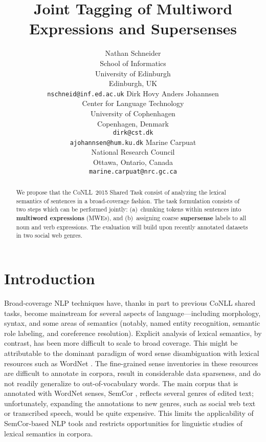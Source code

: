\documentclass[11pt]{article}
\title{Joint Tagging of Multiword Expressions and Supersenses}
\author{
Nathan Schneider \\
		School of Informatics\\
	   	University of Edinburgh\\
	    Edinburgh, UK\\
	    {\tt nschneid@inf.ed.ac.uk} \And
Dirk Hovy \quad Anders Johannsen\\
Center for Language Technology\\
University of Cophenhagen\\
Copenhagen, Denmark\\
{\tt dirk@cst.dk}\\ {\tt ajohannsen@hum.ku.dk} \And
Marine Carpuat\\
National Research Council\\
Ottawa, Ontario, Canada\\
{\tt marine.carpuat@nrc.gc.ca}}
\date{}
\newcommand{\ensuretext}[1]{#1}
\newcommand{\nssmarker}{\ensuretext{\textcolor{magenta}{\ensuremath{^{\textsc{NS}}_{\textsc{S}}}}}}
\newcommand{\arkcomment}[3]{\ensuretext{\textcolor{#3}{[#1 #2]}}}
\newcommand{\nss}[1]{\arkcomment{\nssmarker}{#1}{magenta}}
\newcommand{\longversion}[1]{} %
\begin{document}
\maketitle

\begin{abstract}
We propose that the CoNLL~2015 Shared Task 
consist of analyzing the lexical semantics of sentences 
in a broad-coverage fashion. 
The task formulation consists of two steps which can be performed jointly:
(a)~chunking tokens within sentences into \textbf{multiword expressions} (MWEs), and 
(b)~assigning coarse \textbf{supersense} labels to all noun and verb expressions. 
The evaluation will build upon recently annotated datasets in two social web genres.
\longversion{We expect that the task formulation will foster engagement across 
multiple subcommunities of computational semantics, 
and facilitate empirical comparison of methodologically diverse systems.}
\end{abstract}

\section{Introduction}

Broad-coverage NLP techniques have, thanks in part to previous CoNLL shared tasks, 
become mainstream for several aspects of language---including morphology, syntax, 
and some areas of semantics (notably, named entity recognition, %
semantic role labeling, %
and coreference resolution). %
Explicit analysis of lexical semantics, by contrast, has been more difficult to scale 
to broad coverage. %
This might be attributable to the dominant paradigm of word sense disambiguation 
with lexical resources such as WordNet \citep{wordnet}.
The fine-grained sense inventories in these resources 
are difficult to annotate in corpora, result in considerable data sparseness, 
and do not readily generalize to out-of-vocabulary words.
The main corpus that is annotated with WordNet senses, 
SemCor \citep{semcor}, reflects several genres of edited text; 
unfortunately, expanding the annotations to new genres, such as social web text 
or transcribed speech, would be quite expensive.
This limits the applicability of SemCor-based NLP tools 
and restricts opportunities for linguistic studies of lexical semantics in corpora.
\end{document}
